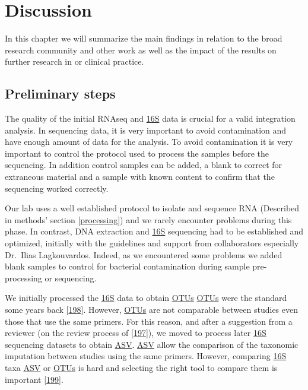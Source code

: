 \documentclass[
  12pt,
  a4paper,
  twoside,
  openright]{book}
\begin{document}
\hypertarget{discussion}{%
\chapter{Discussion}\label{discussion}}

In this chapter we will summarize the main findings in relation to the broad research community and other work as well as the impact of the results on further research in or clinical practice.

\hypertarget{preliminary-steps}{%
\section{Preliminary steps}\label{preliminary-steps}}

The quality of the initial RNAseq and \protect\hyperlink{acronyms_16S}{16S} data is crucial for a valid integration analysis.
In sequencing data, it is very important to avoid contamination and have enough amount of data for the analysis.
To avoid contamination it is very important to control the protocol used to process the samples before the sequencing.
In addition control samples can be added, a blank to correct for extraneous material and a sample with known content to confirm that the sequencing worked correctly.

Our lab uses a well established protocol to isolate and sequence RNA (Described in methods' section \ref{processing}) and we rarely encounter problems during this phase.
In contrast, DNA extraction and \protect\hyperlink{acronyms_16S}{16S} sequencing had to be established and optimized, initially with the guidelines and support from collaborators especially Dr.~Ilias Lagkouvardos.
Indeed, as we encountered some problems we added blank samples to control for bacterial contamination during sample pre-processing or sequencing.

We initially processed the \protect\hyperlink{acronyms_16S}{16S} data to obtain \protect\hyperlink{acronyms_OTUs}{OTUs}
\protect\hyperlink{acronyms_OTUs}{OTUs} were the standard some years back {[}\protect\hyperlink{ref-callahan2017}{198}{]}.
However, \protect\hyperlink{acronyms_OTUs}{OTUs} are not comparable between studies even those that use the same primers.
For this reason, and after a suggestion from a reviewer (on the review process of {[}\protect\hyperlink{ref-revilla2021}{197}{]}), we moved to process later \protect\hyperlink{acronyms_16S}{16S} sequencing datasets to obtain \protect\hyperlink{acronyms_ASV}{ASV}.
\protect\hyperlink{acronyms_ASV}{ASV} allow the comparison of the taxonomic imputation between studies using the same primers.
However, comparing \protect\hyperlink{acronyms_16S}{16S} taxa \protect\hyperlink{acronyms_ASV}{ASV} or \protect\hyperlink{acronyms_OTUs}{OTUs} is hard and selecting the right tool to compare them is important {[}\protect\hyperlink{ref-nearing2022}{199}{]}.
\end{document}
